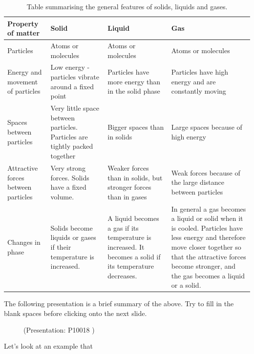 \begin{table}[h]
\begin{center}
\caption{Table summarising the general features of solids, liquids and gases.}
\label{tab:microscopic:kinetic theory}
\begin{tabular}{|p{3cm}|p{3cm}|p{3cm}|p{3cm}|}\hline
\textbf{Property of matter} & \textbf{Solid} & \textbf{Liquid} & \textbf{Gas} \\\hline
Particles & Atoms or molecules & Atoms or molecules & Atoms or molecules \\\hline
Energy and movement of particles & Low energy - particles vibrate around a fixed point & Particles have more energy than in the solid phase & Particles have high energy and are constantly moving  \\\hline
Spaces between particles & Very little space between particles. Particles are tightly packed together & Bigger spaces than in solids & Large spaces because of high energy  \\\hline
Attractive forces between particles & Very strong forces. Solids have a fixed volume. & Weaker forces than in solids, but stronger forces than in gases & Weak forces because of the large distance between particles  \\\hline
Changes in phase & Solids become liquids or gases if their temperature is increased. & A liquid becomes a gas if its temperature is increased. It becomes a solid if its temperature decreases. & In general a gas becomes a liquid or solid when it is cooled. Particles have less energy and therefore move closer together so that the attractive forces become stronger, and the gas becomes a liquid or a solid.  \\\hline
\end{tabular}
\end{center}
\end{table}
    \par
      \label{m38730*eip-933}The following presentation is a brief summary of the above. Try to fill in the blank spaces before clicking onto the next slide.
    \setcounter{subfigure}{0}
	\begin{figure}[H] %
    \label{m38730*slidesharemedia}\label{m38730*slideshareflash} { (Presentation:  P10018 )}
      \vspace{2pt}
    \vspace{.1in}
 \end{figure}       \par \label{m38730*id309036}Let's look at an example that 
